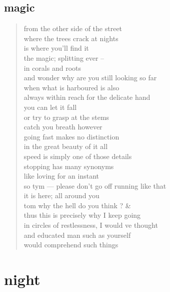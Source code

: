 \documentclass[11pt]{article}
\begin{document}
\subsection{magic}
\label{sec:orge220ab8}
\begin{verse}
from the other side of the street\\
where the trees crack at nights\\
is where you'll find it\\
the magic; splitting ever --\\
in corals and roots\\
and wonder why are you still looking so far\\
when what is harboured is also\\
always within reach for the delicate hand\\
\vspace*{1em}
you can let it fall\\
or try to grasp at the stems\\
catch you breath however\\
going fast makes no distinction\\
in the great beauty of it all\\
speed is simply one of those details\\
\vspace*{1em}
stopping has many synonyms\\
like loving for an instant\\
so tym --- please don't go off running like that\\
it is here; all around you\\
tom why the hell do you think ? \&\\
thus this is precisely why I keep going\\
in circles of restlessness, I would ve thought\\
and educated man such as yourself\\
would comprehend such things\\
\end{verse}
\section{night}
\label{sec:org21e6792}
\end{document}
